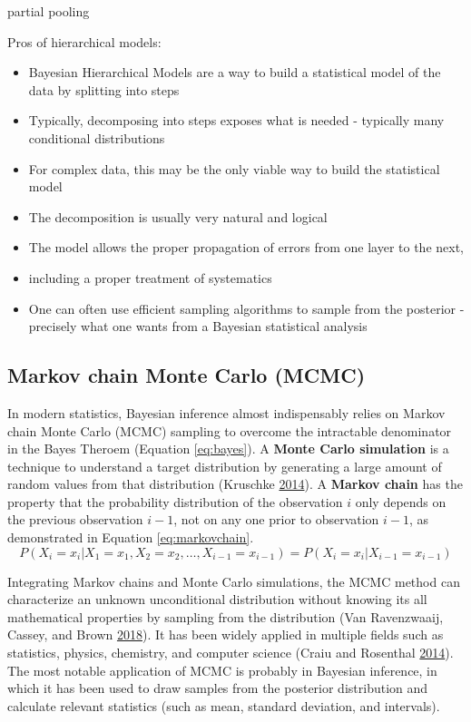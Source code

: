 \documentclass[12pt]{book}
\numberwithin{equation}{chapter}
\providecommand{\tightlist}{%
  \setlength{\itemsep}{0pt}\setlength{\parskip}{0pt}}
\begin{document}
partial pooling

Pros of hierarchical models:

\begin{itemize}
\tightlist
\item
  Bayesian Hierarchical Models are a way to build a statistical model of the data by splitting into steps
\item
  Typically, decomposing into steps exposes what is needed - typically many conditional distributions
\item
  For complex data, this may be the only viable way to build the
  statistical model
\item
  The decomposition is usually very natural and logical
\item
  The model allows the proper propagation of errors from one layer to
  the next,
\item
  including a proper treatment of systematics
\item
  One can often use efficient sampling algorithms to sample from the posterior - precisely what one wants from a Bayesian statistical
  analysis
\end{itemize}

\hypertarget{markov-chain-monte-carlo-mcmc}{%
\subsection{Markov chain Monte Carlo (MCMC)}\label{markov-chain-monte-carlo-mcmc}}

In modern statistics, Bayesian inference almost indispensably relies on Markov chain Monte Carlo (MCMC) sampling to overcome the intractable denominator in the Bayes Theroem (Equation \eqref{eq:bayes}). A \textbf{Monte Carlo simulation} is a technique to understand a target distribution by generating a large amount of random values from that distribution (Kruschke \protect\hyperlink{ref-kruschke2014doing}{2014}). A \textbf{Markov chain} has the property that the probability distribution of the observation \(i\) only depends on the previous observation \(i-1\), not on any one prior to observation \(i-1\), as demonstrated in Equation \eqref{eq:markovchain}.
\begin{equation}
P\left(X_{i}=x_{i} | X_{1}=x_{1}, X_{2}=x_{2}, \ldots, X_{i-1}=x_{i-1}\right) = P\left(X_{i}=x_{i} | X_{i-1}=x_{i-1}\right)
\label{eq:markovchain}
\end{equation}

Integrating Markov chains and Monte Carlo simulations, the MCMC method can characterize an unknown unconditional distribution without knowing its all mathematical properties by sampling from the distribution (Van Ravenzwaaij, Cassey, and Brown \protect\hyperlink{ref-van2018simple}{2018}). It has been widely applied in multiple fields such as statistics, physics, chemistry, and computer science (Craiu and Rosenthal \protect\hyperlink{ref-craiu2014bayesian}{2014}). The most notable application of MCMC is probably in Bayesian inference, in which it has been used to draw samples from the posterior distribution and calculate relevant statistics (such as mean, standard deviation, and intervals).
\end{document}

